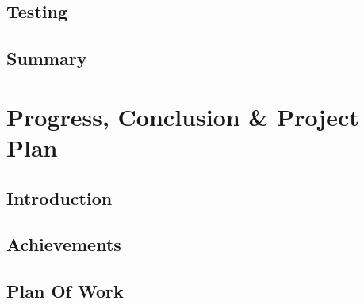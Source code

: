 \documentclass[a4paper,12pt,oneside]{book}
\begin{document}
	\section{Testing}
		
	\section{Summary}
		
		
\chapter{Progress, Conclusion \& Project Plan}
	\section{Introduction}
		
	\section{Achievements}
		
	\section{Plan Of Work}
		
		


\renewcommand{\bibname}{Bibliography}

\end{document}
